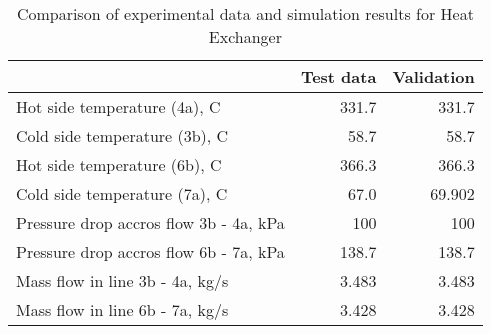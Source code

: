 \begin{table}
\label{tab:Comparison}
\caption{Comparison of experimental data and simulation results for Heat Exchanger}
\begin{center}
\begin{tabulary}{0.9\textwidth}{LRR}
\toprule
& Test data \cite{Iverson_2013}  & Validation \\
\midrule
Hot side temperature (4a), C & 331.7 & 331.7 \\
Cold side temperature (3b), C & 58.7 & 58.7 \\
Hot side temperature (6b), C & 366.3 & 366.3 \\
Cold side temperature (7a), C & 67.0 & 69.902 \\
Pressure drop accros flow 3b - 4a, kPa & 100 & 100 \\
Pressure drop accros flow 6b - 7a, kPa & 138.7 & 138.7 \\
Mass flow in line 3b - 4a, kg/s & 3.483 & 3.483 \\
Mass flow in line 6b - 7a, kg/s & 3.428 & 3.428 \\
\bottomrule
\end{tabulary}
\end{center}
\end{table}